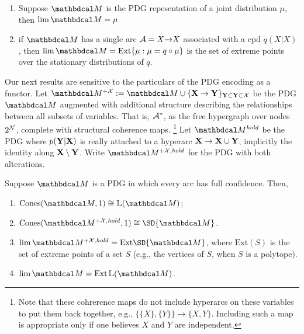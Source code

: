 \begin{example}
\begin{enumerate}
    \item  Suppose $\dg M$ is the PDG repesentation of a joint distribution $\mu$, then $\lim \dg M = \mu$
    \item if $\dg M$ has a single arc $\mathcal A = X{\to }X$ associated with a cpd $q(X|X)$, then $\lim \dg M = \mathrm{Ext} \{ \mu : \mu = q \circ \mu \}$ is the set of extreme points over the stationary distributions of $q$.  
\end{enumerate}    
\end{example}


Our next results are sensitive to the particulars of the PDG encoding as a functor. Let $\dg M^{+\X} := \dg M \cup \{ \mat X \to \mat Y \}_{\mat Y \subset \mat Y \subset \X}$
be the PDG $\dg M$ augmented with additional structure describing the relationships between all subsets of variables. That is, $\mathcal A^*$, as the free hypergraph over nodes $2^\mathcal N$, complete with structural coherence maps.
\unskip\footnote{
Note that these cohrerence maps do not include hyperarcs on these variables to put them back together, e.g., $\{ \{X\}, \{Y\}\} \to \{X,Y\}$.
Including such a map is appropriate only if one believes $X$ and $Y$ are independent.
}
Let $\dg M^{\mathit{hold}}$ be the PDG where $p(\mathbf Y|\mathbf X)$ is really attached to a hyperarc $\mathbf X \to \mathbf X \cup \mathbf Y$, implicitly the identity along $\mathbf X \setminus \mathbf Y$. 
Write $\dg M^{+\X,\mathit{hold}}$ for the PDG with both alterations.

\begin{theorem}
    Suppose $\dg M$ is a PDG in which every arc has full confidence. Then, 
    \begin{enumerate}[itemsep=0pt,topsep=0pt]
        \item $\mathrm{Cones}(\dg M, 1) \cong \mathbb L(\dg M)$;
        \item $\mathrm{Cones}(\dg M^{+\X,\mathit{hold}}, 1) 
            \cong \SD{\dg M}$. 
        
        \item $\lim \dg M^{+\X,\mathit{hold}} = \mathrm{Ext} \SD{\dg M}$, where $\mathrm{Ext}(S)$ is the set of extreme points of a set $S$ (e.g., the vertices of $S$, when $S$ is a polytope). 
            
        \item $\lim \dg M = \mathop{\mathrm{Ext}} \mathbb L(\dg M)$. 
    \end{enumerate}
\end{theorem}

